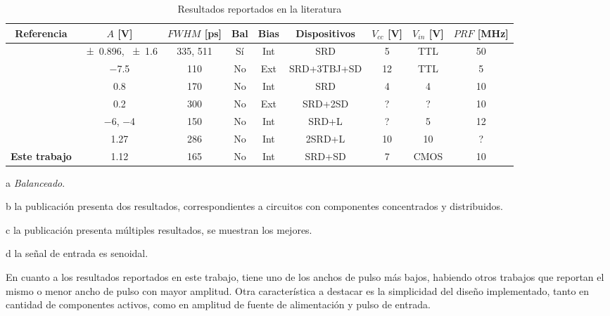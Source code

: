 \begin{table}
  \begin{threeparttable}[b]
    \caption{Resultados reportados en la literatura}
    \label{tab:resultados_literatura}
    {\footnotesize
    \begin{tabular}{ccccccccc}
        \hline
        Referencia & $A$ [\unit{\volt}] & $FWHM$ [\unit{\pico\second}] &
        Bal \tnote{a} & Bias & Dispositivos & $V_{cc}$ [\unit{\volt}] & $V_{in}$ [\unit{\volt}] & $PRF$ [\unit{\mega\hertz}] \\
        \hline
        \cite{rulikowski2004} & \num{\pm 0.896}, \num{\pm 1.6} \tnote{b} & 335, 511 & Sí & Int & SRD & 5 & TTL & 50 \\
        \cite{protiva2009} & \num{-7.5} & 110 & No & Ext & SRD+3TBJ+SD & 12 & TTL & 5 \\
        \cite{kamal2014} & \num{0.8} & 170 & No & Int & SRD & 4 & 4 & 10 \\
        \cite{han2002} & \num{0.2} & 300 & No & Ext & SRD+2SD & ? & ? & 10 \\
        \cite{han2005} & \num{-6}, \num{-4} & 150 & No & Int & SRD+L & ? & 5 & 12 \\
        \cite{oloumi2018} & \num{1.27} \tnote{c} & 286 & No & Int & 2SRD+L & 10 & 10 \tnote{d} & ? \\
        \textbf{Este trabajo} & \num{1.12} & 165 & No & Int & SRD+SD & 7 & CMOS  &
        \num{10} \\
    \end{tabular}
}
   \begin{tablenotes}
     \item [a] \textit{Balanceado}.
     \item [b] la publicación presenta dos resultados, correspondientes a
       circuitos con componentes concentrados y distribuidos.
     \item [c] la publicación presenta múltiples resultados, se muestran
       los mejores.
     \item [d] la señal de entrada es senoidal.
   \end{tablenotes}
  \end{threeparttable}
\end{table}


En cuanto a los resultados reportados en este trabajo, tiene uno de los anchos de pulso más bajos,
habiendo otros trabajos que reportan el mismo o menor ancho de pulso con mayor amplitud. Otra
característica a destacar es la simplicidad del diseño implementado, tanto en cantidad de
componentes activos, como en amplitud de fuente de alimentación y pulso de entrada.


